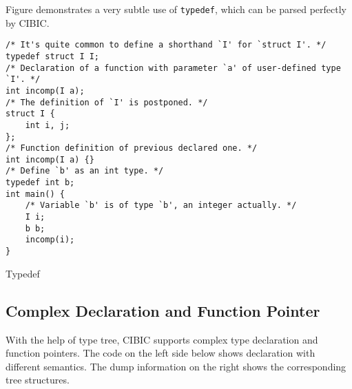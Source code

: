 \documentclass[10pt, a4paper]{article}
\begin{document}
Figure demonstrates a very subtle use of \texttt{typedef}, which can be parsed perfectly by CIBIC.

\begin{listing}[H]
    \centering
    \begin{verbatim}
/* It's quite common to define a shorthand `I' for `struct I'. */
typedef struct I I;
/* Declaration of a function with parameter `a' of user-defined type `I'. */
int incomp(I a);
/* The definition of `I' is postponed. */
struct I {
    int i, j;
};
/* Function definition of previous declared one. */
int incomp(I a) {}
/* Define `b' as an int type. */
typedef int b;
int main() {
    /* Variable `b' is of type `b', an integer actually. */
    I i;
    b b;
    incomp(i);
}
\end{verbatim}
\caption {Typedef}
\end{listing}
\newpage
\subsection{Complex Declaration and Function Pointer}
With the help of type tree, CIBIC supports complex type declaration and function
pointers. The code on the left side below shows declaration with different
semantics. The dump information on the right shows the corresponding tree
structures.
\end{document}
